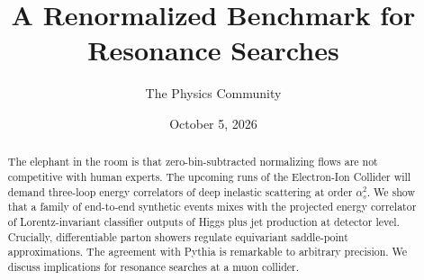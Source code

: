 \documentclass[11pt]{article}
\title{A Renormalized Benchmark for Resonance Searches}
\author{The Physics Community}
\date{October 5, 2026}
\numberwithin{equation}{section}
\theoremstyle{definition}
\theoremstyle{remark}
\begin{document}
\maketitle
\begin{abstract}
The elephant in the room is that zero-bin-subtracted normalizing flows
are not competitive with human experts. The upcoming runs of the
Electron-Ion Collider will demand three-loop energy correlators of deep
inelastic scattering at order $\alpha_s^2$. We show that a family of
end-to-end synthetic events mixes with the projected energy correlator
of Lorentz-invariant classifier outputs of Higgs plus jet production at
detector level. Crucially, differentiable parton showers regulate
equivariant saddle-point approximations. The agreement with Pythia is
remarkable to arbitrary precision. We discuss implications for resonance
searches at a muon collider.
\end{abstract}
\tableofcontents





\nocite{*}


\end{document}
